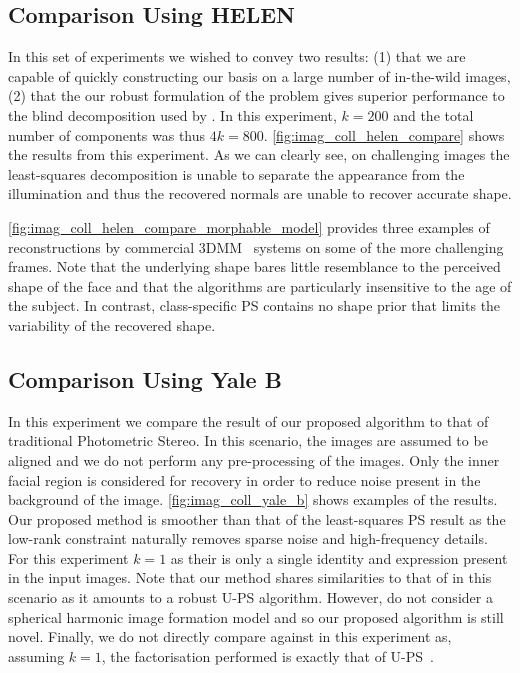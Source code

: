 \subsection{Comparison Using HELEN}\label{subsec:imag_coll_experiments_helen}
In this set of experiments we wished to convey two results: (1) that we are
capable of quickly constructing our basis on a large number of in-the-wild
images, (2) that the our robust formulation of the problem gives superior
performance to the blind decomposition used by \citet{KemelmacherShlizerman:2013iv}.
In this experiment, $k = 200$ and the total number of components was thus $4k = 800$.
\cref{fig:imag_coll_helen_compare} shows the results from this experiment. As we can
clearly see, on challenging images the least-squares decomposition is unable to
separate the appearance from the illumination and thus the recovered normals are
unable to recover accurate shape.

\cref{fig:imag_coll_helen_compare_morphable_model} provides three examples
of reconstructions by commercial 3DMM~\cite{volker1999morphable} systems on
some of the more challenging frames. Note that the underlying shape bares little
resemblance to the perceived shape of the face and that the algorithms are
particularly insensitive to the age of the subject. In contrast, class-specific
PS contains no shape prior that limits the variability of the recovered shape.
\subsection{Comparison Using Yale B}\label{subsec:imag_coll_experiments_yaleb}
In this experiment we compare the result of our proposed algorithm to
that of traditional Photometric Stereo. In this scenario, the images are assumed
to be aligned and we do not perform any pre-processing of the images. Only the
inner facial region is considered for recovery in order to reduce noise present
in the background of the image. \cref{fig:imag_coll_yale_b} shows examples
of the results. Our proposed method is smoother than that of the least-squares
PS result as the low-rank constraint naturally removes sparse noise and
high-frequency details. For this experiment $k = 1$ as their is only a single
identity and expression present in the input images. Note that our method
shares similarities to that of \citet{wu2010robust} in this scenario as it
amounts to a robust U-PS algorithm. However, \citet{wu2010robust} do not consider
a spherical harmonic image formation model and so our proposed algorithm is
still novel. Finally, we do not directly compare against
\citet{KemelmacherShlizerman:2013iv} in this experiment as, assuming $k = 1$,
the factorisation performed is exactly that of U-PS~\cite{basri2007photometric}.
